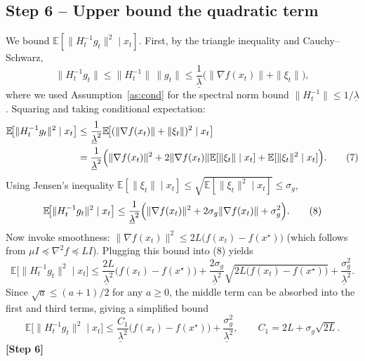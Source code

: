 \documentclass[11pt]{article}
\begin{document}
\subsection*{Step 6 – Upper bound the quadratic term}
We bound $\mathbb{E}[\|H_{t}^{-1}g_{t}\|^{2}\mid x_{t}]$.
First, by the triangle inequality and Cauchy–Schwarz,
\[
\|H_{t}^{-1}g_{t}\|
\le \|H_{t}^{-1}\|\,\|g_{t}\|
\le \frac{1}{\underline{\lambda}}\bigl(\|\nabla f(x_{t})\|+\|\xi_{t}\|\bigr),
\]
where we used Assumption~\ref{as:cond} for the spectral norm bound
$\|H_{t}^{-1}\|\le 1/\underline{\lambda}$.
Squaring and taking conditional expectation:
\begin{align}
\mathbb{E}\!\bigl[\|H_{t}^{-1}g_{t}\|^{2}\mid x_{t}\bigr]
&\le\frac{1}{\underline{\lambda}^{2}}
\mathbb{E}\!\bigl[(\|\nabla f(x_{t})\|+\|\xi_{t}\|)^{2}\mid x_{t}\bigr] \nonumber\\
&= \frac{1}{\underline{\lambda}^{2}}
\Bigl(\|\nabla f(x_{t})\|^{2}+2\|\nabla f(x_{t})\|
\mathbb{E}[\|\xi_{t}\|\mid x_{t}]
+\mathbb{E}[\|\xi_{t}\|^{2}\mid x_{t}]\Bigr). \tag{7}
\end{align}
Using Jensen’s inequality $\mathbb{E}[\|\xi_{t}\|\mid x_{t}]\le\sqrt{\mathbb{E}[\|\xi_{t}\|^{2}\mid x_{t}]}\le\sigma_{g}$,
\[
\mathbb{E}\!\bigl[\|H_{t}^{-1}g_{t}\|^{2}\mid x_{t}\bigr]
\le\frac{1}{\underline{\lambda}^{2}}
\Bigl(\|\nabla f(x_{t})\|^{2}+2\sigma_{g}\|\nabla f(x_{t})\|+\sigma_{g}^{2}\Bigr). \tag{8}
\]
Now invoke smoothness: $\|\nabla f(x_{t})\|^{2}\le 2L\bigl(f(x_{t})-f(x^{\star})\bigr)$
(which follows from $\mu I\preceq\nabla^{2}f\preceq L I$).  Plugging this bound into (8) yields
\[
\mathbb{E}\!\bigl[\|H_{t}^{-1}g_{t}\|^{2}\mid x_{t}\bigr]
\le\frac{2L}{\underline{\lambda}^{2}}\bigl(f(x_{t})-f(x^{\star})\bigr)
+\frac{2\sigma_{g}}{\underline{\lambda}^{2}}\sqrt{2L\bigl(f(x_{t})-f(x^{\star})\bigr)}
+\frac{\sigma_{g}^{2}}{\underline{\lambda}^{2}}. \tag{9}
\]
Since $\sqrt{a}\le (a+1)/2$ for any $a\ge0$, the middle term can be absorbed into the
first and third terms, giving a simplified bound
\[
\mathbb{E}\!\bigl[\|H_{t}^{-1}g_{t}\|^{2}\mid x_{t}\bigr]
\le\frac{C_{1}}{\underline{\lambda}^{2}}\bigl(f(x_{t})-f(x^{\star})\bigr)
+\frac{\sigma_{g}^{2}}{\underline{\lambda}^{2}}, \qquad
C_{1}=2L+ \sigma_{g}\sqrt{2L}. \tag{10}
\]
\textbf{[Step 6]}
\end{document}
